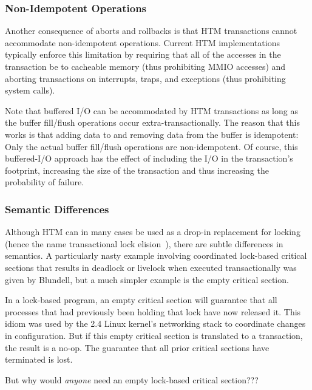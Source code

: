 \subsubsection{Non-Idempotent Operations}
\label{sec:future:Non-Idempotent Operations}

Another consequence of aborts and rollbacks is that HTM transactions
cannot accommodate non-idempotent operations.
Current HTM implementations typically enforce this limitation by
requiring that all of the accesses in the transaction be to cacheable
memory (thus prohibiting MMIO accesses) and aborting transactions on
interrupts, traps, and exceptions (thus prohibiting system calls).

Note that buffered I/O can be accommodated by HTM transactions as
long as the buffer fill/flush operations occur extra-transactionally.
The reason that this works is that adding data to and removing data
from the buffer is idempotent: Only the actual buffer fill/flush
operations are non-idempotent.
Of course, this buffered-I/O approach has the effect of including the I/O
in the transaction's footprint, increasing the size of the transaction
and thus increasing the probability of failure.

\subsubsection{Semantic Differences}
\label{sec:future:Semantic Differences}

Although HTM can in many cases be used as a drop-in replacement for locking
(hence the name transactional lock
elision~\cite{DaveDice2008TransactLockElision}),
there are subtle differences in semantics.
A particularly nasty example involving coordinated lock-based critical
sections that results in deadlock or livelock when executed transactionally
was given by Blundell\cite{Blundell2006TMdeadlock}, but a much simpler
example is the empty critical section.

In a lock-based program, an empty critical section will guarantee
that all processes that had previously been holding that lock have
now released it.
This idiom was used by the 2.4 Linux kernel's networking stack to
coordinate changes in configuration.
But if this empty critical section is translated to a transaction,
the result is a no-op.
The guarantee that all prior critical sections have terminated is
lost.

\QuickQuiz{}
	But why would \emph{anyone} need an empty lock-based critical
	section???
 \QuickQuizEnd

